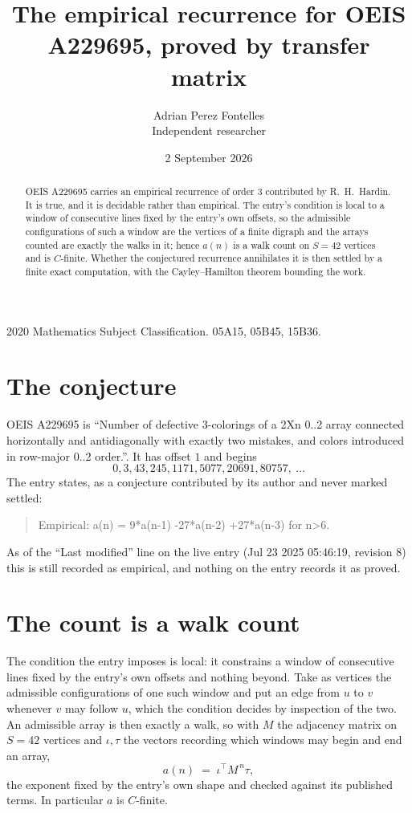 \documentclass[11pt,a4paper]{article}
\title{The empirical recurrence for OEIS A229695, proved by transfer matrix}
\author{Adrian Perez Fontelles\\ \small Independent researcher}
\date{2 September 2026}
\theoremstyle{plain}
\theoremstyle{definition}
\begin{document}
\maketitle

\begin{abstract}
OEIS A229695 carries an empirical recurrence of order $3$ contributed by R.~H.~Hardin. It is
true, and it is decidable rather than empirical. The entry's condition is local to a window of consecutive lines fixed by the entry's own offsets, so
the admissible configurations of such a window are the vertices of a finite digraph and the
arrays counted are exactly the walks in it; hence $a(n)$ is a walk count on $S=42$ vertices
and is $C$-finite. Whether the conjectured recurrence annihilates it is then settled by a
finite exact computation, with the Cayley--Hamilton theorem bounding the work.
\end{abstract}

\noindent\small 2020 Mathematics Subject Classification. 05A15, 05B45, 15B36.\normalsize

\section{The conjecture}

OEIS A229695 is ``Number of defective 3-colorings of a 2Xn 0..2 array connected horizontally and antidiagonally with exactly two mistakes, and colors introduced in row-major 0..2 order.''. It has offset $1$ and begins
\[
0, 3, 43, 245, 1171, 5077, 20691, 80757,\ \dots
\]
The entry states, as a conjecture contributed by its author and never marked settled:
\begin{quote}
Empirical: a(n) = 9*a(n-1) -27*a(n-2) +27*a(n-3) for n>6.
\end{quote}
As of the ``Last modified'' line on the live entry (Jul 23 2025 05:46:19, revision 8) this is still
recorded as empirical, and nothing on the entry records it as proved.

\section{The count is a walk count}

The condition the entry imposes is local: it constrains a window of consecutive lines fixed by the entry's own offsets and nothing beyond. Take as
vertices the admissible configurations of one such window and put an edge from $u$ to $v$
whenever $v$ may follow $u$, which the condition decides by inspection of the two. An
admissible array is then exactly a walk, so with $M$ the adjacency matrix on $S=42$ vertices
and $\iota,\tau$ the vectors recording which windows may begin and end an array,
\[
a(n)\;=\;\iota^{\!\top}M^{\,n}\tau ,
\]
the exponent fixed by the entry's own shape and checked against its published terms. In
particular $a$ is $C$-finite.
\end{document}
